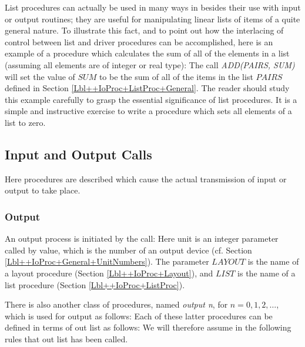 \documentclass[a4paper,11pt]{article}
\begin{document}
List procedures can actually be used in many ways in \Algol besides
their use with input or output routines; they are useful for
manipulating linear lists of items of a quite general nature.  To
illustrate this fact, and to point out how the interlacing of control
between list and driver procedures can be accomplished, here is an
example of a procedure which calculates the sum of all of the elements
in a list (assuming all elements are of integer or real type):
\noindent{}The call {\it ADD(PAIRS, SUM)} will set the value of $SUM$
to be the sum of all of the items in the list $PAIRS$ defined in
Section \ref{Lbl++IoProc+ListProc+General}.  The reader should study
this example carefully to grasp the essential significance of list
procedures.  It is a simple and instructive exercise to write a
procedure which sets all elements of a list to zero.

\subsection{Input and Output Calls}
\label{Lbl++IoProc+IoCalls}

Here procedures are described which cause the actual transmission of
input or output to take place.

\subsubsection{Output}
\label{Lbl++IoProc+IoCalls+Output}

An output process is initiated by the call:
\noindent{}Here unit is an integer parameter called by value, which is
the number of an output device (cf. Section
\ref{Lbl++IoProc+General+UnitNumbers}). The parameter $LAYOUT$ is the
name of a layout procedure (Section \ref{Lbl++IoProc+Layout}), and
$LIST$ is the name of a list procedure (Section
\ref{Lbl++IoProc+ListProc}).

There is also another class of procedures, named {\it output n}, for
$n = 0, 1, 2, \dots$, which is used for output as follows:
\noindent{}Each of these latter procedures can be defined in terms of
out list as follows:
\noindent{}We will therefore assume in the following rules that out
list has been called.
\end{document}
